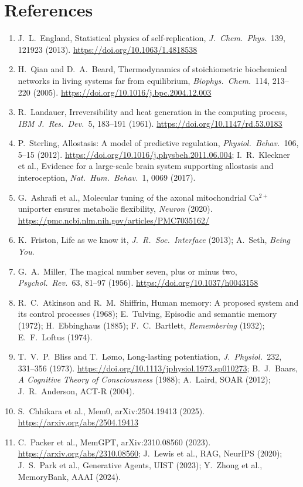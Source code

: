 \documentclass[11pt,a4paper]{article}
\begin{document}
\section*{References}
\begin{enumerate}
\item J.~L.~England, Statistical physics of self-replication, \textit{J.\ Chem.\ Phys.\ }139, 121923 (2013). \url{https://doi.org/10.1063/1.4818538}
\item H.~Qian and D.~A.~Beard, Thermodynamics of stoichiometric biochemical networks in living systems far from equilibrium, \textit{Biophys.\ Chem.\ }114, 213--220 (2005). \url{https://doi.org/10.1016/j.bpc.2004.12.003}
\item R.~Landauer, Irreversibility and heat generation in the computing process, \textit{IBM J.\ Res.\ Dev.\ }5, 183--191 (1961). \url{https://doi.org/10.1147/rd.53.0183}
\item P.~Sterling, Allostasis: A model of predictive regulation, \textit{Physiol.\ Behav.\ }106, 5--15 (2012). \url{https://doi.org/10.1016/j.physbeh.2011.06.004}; I.~R.~Kleckner et al., Evidence for a large-scale brain system supporting allostasis and interoception, \textit{Nat.\ Hum.\ Behav.\ }1, 0069 (2017).
\item G.~Ashrafi et al., Molecular tuning of the axonal mitochondrial Ca$^{2+}$ uniporter ensures metabolic flexibility, \textit{Neuron} (2020). \url{https://pmc.ncbi.nlm.nih.gov/articles/PMC7035162/}
\item K.~Friston, Life as we know it, \textit{J.\ R.\ Soc.\ Interface} (2013); A.~Seth, \textit{Being You}.
\item G.~A.~Miller, The magical number seven, plus or minus two, \textit{Psychol.\ Rev.\ }63, 81--97 (1956). \url{https://doi.org/10.1037/h0043158}
\item R.~C.~Atkinson and R.~M.~Shiffrin, Human memory: A proposed system and its control processes (1968); E.~Tulving, Episodic and semantic memory (1972); H.~Ebbinghaus (1885); F.~C.~Bartlett, \textit{Remembering} (1932); E.~F.~Loftus (1974).
\item T.~V.~P.~Bliss and T.~L{\o}mo, Long-lasting potentiation, \textit{J.\ Physiol.\ }232, 331--356 (1973). \url{https://doi.org/10.1113/jphysiol.1973.sp010273}; B.~J.~Baars, \textit{A Cognitive Theory of Consciousness} (1988); A.~Laird, SOAR (2012); J.~R.~Anderson, ACT-R (2004).
\item S.~Chhikara et al., Mem0, arXiv:2504.19413 (2025). \url{https://arxiv.org/abs/2504.19413}
\item C.~Packer et al., MemGPT, arXiv:2310.08560 (2023). \url{https://arxiv.org/abs/2310.08560}; J.~Lewis et al., RAG, NeurIPS (2020); J.~S.~Park et al., Generative Agents, UIST (2023); Y.~Zhong et al., MemoryBank, AAAI (2024).

\end{enumerate}
\end{document}
